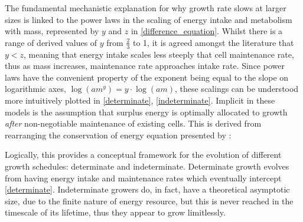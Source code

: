 \documentclass[a4paper]{article} %
\begin{document}
        The fundamental mechanistic explanation for why growth rate slows at larger sizes is linked to the power laws in the scaling of energy intake and metabolism with mass, represented by $y$ and $z$ in \eqref{difference_equation}. Whilst there is a range of derived values of $y$ from $\frac{2}{3}$ to 1, it is agreed amongst the literature that $y < z$, meaning that energy intake scales less steeply that cell maintenance rate, thus as mass increases, maintenance rate approaches intake rate. Since power laws have the convenient property of the exponent being equal to the slope on logarithmic axes, $\log{(am^y)} = y\cdot \log{(am)}$, these scalings can be understood more intuitively plotted in \ref{determinate}, \ref{indeterminate}.  Implicit in these models is the assumption that surplus energy is optimally allocated to growth \textit{after} non-negotiable maintenance of existing cells. This is derived from rearranging the conservation of energy equation presented by \cite{West2001}:
        
        Logically, this provides a conceptual framework for the evolution of different growth schedules: determinate and indeterminate. Determinate growth evolves from having energy intake and maintenance rates which eventually intercept \ref{determinate}. Indeterminate growers do, in fact, have a theoretical asymptotic size, due to the finite nature of energy resource, but this is never reached in the timescale of its lifetime, thus they appear to grow limitlessly.
    
\end{document}
